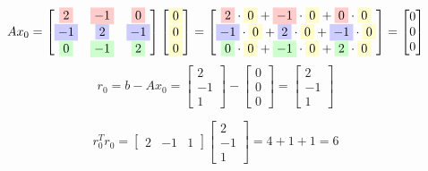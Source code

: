 \documentclass[12pt,a4paper]{article}
\begin{document}
\[
Ax_0 = 
\begin{bmatrix}
\colorbox{red!20}{$2$} & \colorbox{red!20}{$-1$} & \colorbox{red!20}{$0$} \\
\colorbox{blue!20}{$-1$} & \colorbox{blue!20}{$2$} & \colorbox{blue!20}{$-1$} \\
\colorbox{green!20}{$0$} & \colorbox{green!20}{$-1$} & \colorbox{green!20}{$2$}
\end{bmatrix}
\begin{bmatrix}
\colorbox{yellow!20}{$0$} \\
\colorbox{yellow!20}{$0$} \\
\colorbox{yellow!20}{$0$}
\end{bmatrix}
=
\begin{bmatrix}
\colorbox{red!20}{$2$} \cdot \colorbox{yellow!20}{$0$} + \colorbox{red!20}{$-1$} \cdot \colorbox{yellow!20}{$0$} + \colorbox{red!20}{$0$} \cdot \colorbox{yellow!20}{$0$} \\
\colorbox{blue!20}{$-1$} \cdot \colorbox{yellow!20}{$0$} + \colorbox{blue!20}{$2$} \cdot \colorbox{yellow!20}{$0$} + \colorbox{blue!20}{$-1$} \cdot \colorbox{yellow!20}{$0$} \\
\colorbox{green!20}{$0$} \cdot \colorbox{yellow!20}{$0$} + \colorbox{green!20}{$-1$} \cdot \colorbox{yellow!20}{$0$} + \colorbox{green!20}{$2$} \cdot \colorbox{yellow!20}{$0$}
\end{bmatrix}
=
\begin{bmatrix}
0 \\ 0 \\ 0
\end{bmatrix}
\]
\[
r_0 = b - Ax_0 = \begin{bmatrix} 2 \\ -1 \\ 1 \end{bmatrix} - \begin{bmatrix} 0 \\ 0 \\ 0 \end{bmatrix} = \begin{bmatrix} 2 \\ -1 \\ 1 \end{bmatrix}
\]

\[
r_0^T r_0 = \begin{bmatrix} 2 & -1 & 1 \end{bmatrix} \begin{bmatrix} 2 \\ -1 \\ 1 \end{bmatrix} = 4 + 1 + 1 = 6
\]
\end{document}
